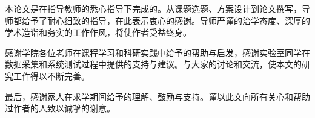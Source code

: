 
本论文是在指导教师的悉心指导下完成的。从课题选题、方案设计到论文撰写，导师都给予了耐心细致的指导，在此表示衷心的感谢。导师严谨的治学态度、深厚的学术造诣和务实的工作作风，将使作者受益终身。

感谢学院各位老师在课程学习和科研实践中给予的帮助与启发，感谢实验室同学在数据采集和系统测试过程中提供的支持与建议。与大家的讨论和交流，使本文的研究工作得以不断完善。

最后，感谢家人在求学期间给予的理解、鼓励与支持。谨以此文向所有关心和帮助过作者的人致以诚挚的谢意。
